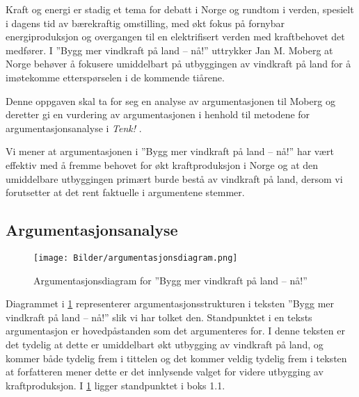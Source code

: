 \documentclass[a4paper,11pt,norsk]{article}
\begin{document}


Kraft og energi er stadig et tema for debatt i Norge og rundtom i verden, spesielt i dagens tid av
bærekraftig omstilling, med økt fokus på fornybar energiproduksjon og overgangen til en elektrifisert verden 
med kraftbehovet det medfører. I ''Bygg mer vindkraft på land – nå!'' \cite{moberg} uttrykker Jan M. Moberg 
at Norge behøver å fokusere umiddelbart på utbyggingen av vindkraft på land for å imøtekomme etterspørselen i de kommende 
tiårene.

Denne oppgaven skal ta for seg en analyse av argumentasjonen til Moberg og deretter gi en vurdering av argumentasjonen i henhold
til metodene for argumentasjonsanalyse i \textit{Tenk!} \cite{tenk}.

Vi mener at argumentasjonen i ''Bygg mer vindkraft på land – nå!'' har vært effektiv med å fremme 
behovet for økt kraftproduksjon i Norge og at den umiddelbare utbyggingen primært burde bestå av vindkraft på land, dersom 
vi forutsetter at det rent faktuelle i argumentene stemmer. 

\subsection*{Argumentasjonsanalyse}
\begin{figure}[H]
    \centering
    \texttt{[image: Bilder/argumentasjonsdiagram.png]}
    \caption{Argumentasjonsdiagram for ''Bygg mer vindkraft på land – nå!'' \cite{moberg}}
    \label{fig:argumentasjonsanalyse}
\end{figure}

Diagrammet i \ref{fig:argumentasjonsanalyse} representerer argumentasjonsstrukturen i teksten ''Bygg mer vindkraft på land – nå!'' \cite{moberg}
slik vi har tolket den. Standpunktet i en teksts argumentasjon er hovedpåstanden som det argumenteres for. I denne teksten er det tydelig at 
dette er umiddelbart økt utbygging av vindkraft på land, og kommer både tydelig frem i tittelen og det kommer veldig tydelig frem i teksten at 
forfatteren mener dette er det innlysende valget for videre utbygging av kraftproduksjon. I \ref{fig:argumentasjonsanalyse} ligger standpunktet i boks 1.1.
\end{document}
